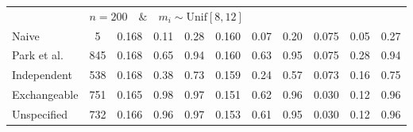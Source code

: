 \documentclass[submit]{smj}
\begin{document}
\begin{table}
\begin{adjustbox}{width=\textwidth}
\begin{tabular}{l|cccccccccc}
		& \multicolumn{10}{l}{$n=200 \quad\& \quad m_i \sim  \text{Unif}[8,12]$}\\
		Naive& 5 & 0.168 & 0.11 & 0.28 & 0.160 & 0.07 & 0.20 & 0.075 & 0.05 & 0.27 \\ 
		Park et al. & 845& 0.168 & 0.65 & 0.94 & 0.160 & 0.63 & 0.95 & 0.075 & 0.28 & 0.94 \\ 
		Independent & 538& 0.168 & 0.38 & 0.73 & 0.159 & 0.24 & 0.57 & 0.073 & 0.16 & 0.75 \\ 
		Exchangeable &751& 0.165 & 0.98 & 0.97 & 0.151 & 0.62 & 0.96 & 0.030 & 0.12 & 0.96 \\ 
		Unspecified &732& 0.166 & 0.96 & 0.97 & 0.153 & 0.61 & 0.95 & 0.030 & 0.12 & 0.96 \\ 
		\hline
	\end{tabular}
\end{adjustbox}
\end{table}
\end{document}
